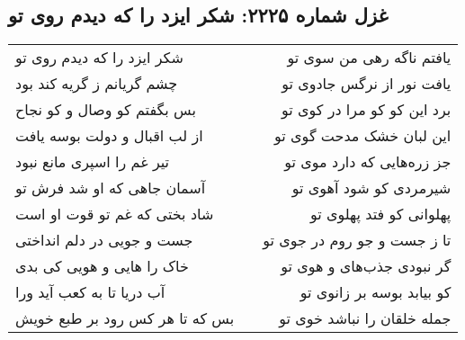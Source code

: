 \begin{center}
\section*{غزل شماره ۲۲۲۵: شکر ایزد را که دیدم روی تو}
\label{sec:2225}
\begin{longtable}{l p{0.5cm} r}
شکر ایزد را که دیدم روی تو
&&
یافتم ناگه رهی من سوی تو
\\
چشم گریانم ز گریه کند بود
&&
یافت نور از نرگس جادوی تو
\\
بس بگفتم کو وصال و کو نجاح
&&
برد این کو کو مرا در کوی تو
\\
از لب اقبال و دولت بوسه یافت
&&
این لبان خشک مدحت گوی تو
\\
تیر غم را اسپری مانع نبود
&&
جز زره‌هایی که دارد موی تو
\\
آسمان جاهی که او شد فرش تو
&&
شیرمردی کو شود آهوی تو
\\
شاد بختی که غم تو قوت او است
&&
پهلوانی کو فتد پهلوی تو
\\
جست و جویی در دلم انداختی
&&
تا ز جست و جو روم در جوی تو
\\
خاک را هایی و هویی کی بدی
&&
گر نبودی جذب‌های و هوی تو
\\
آب دریا تا به کعب آید ورا
&&
کو بیابد بوسه بر زانوی تو
\\
بس که تا هر کس رود بر طبع خویش
&&
جمله خلقان را نباشد خوی تو
\\
\end{longtable}
\end{center}
